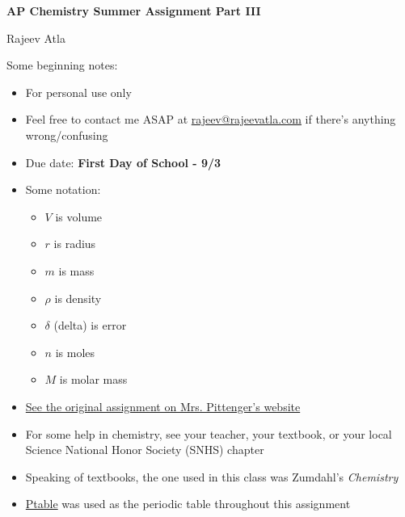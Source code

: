 \documentclass[11pt]{scrartcl}
\begin{document}
\titleformat{\section}{\normalfont\Large\bfseries}{\color{red}\S \thesection}{0.5em}{}
\titleformat{\subsection}{\normalfont\Large\bfseries}{\color{olive}\S \thesubsection}{0.5em}{}
\titleformat{\subsubsection}{\normalfont\Large\bfseries}{\color{blue}\S \thesubsubsection}{0.5em}{}

\begin{center}
    \Large \textbf{AP Chemistry Summer Assignment Part III}
\end{center}
\begin{center}
    \Large Rajeev Atla
\end{center}

Some beginning notes:
\begin{itemize}
    \item For personal use only
    \item Feel free to contact me ASAP at \href{mailto:rajeev@rajeevatla.com}{rajeev@rajeevatla.com} if there's anything wrong/confusing
    \item Due date: \textbf{First Day of School - 9/3}
    \item Some notation:
    \begin{itemize}
        \item $V$ is volume
        \item $r$ is radius
        \item $m$ is mass
        \item $\rho$ is density
        \item $\delta$ (delta) is error
        \item $n$ is moles
        \item $M$ is molar mass
    \end{itemize}
    \item \href{https://www.jpsaos.com/pittenger/APSummerReviewproblems.pdf}{See the original assignment on Mrs. Pittenger's website}
    \item For some help in chemistry, see your teacher, your textbook, or your local Science National Honor Society (SNHS) chapter
    \item Speaking of textbooks, the one used in this class was Zumdahl's \textit{Chemistry}
    \item \href{https://ptable.com}{Ptable} was used as the periodic table throughout this assignment
\end{itemize}
\end{document}
